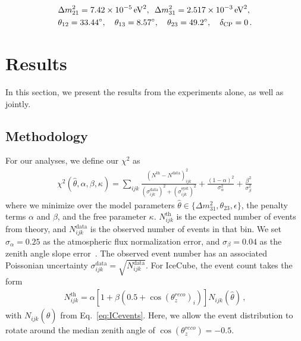 \documentclass[draft=True]{revtex4-2}
\newcommand{\zreco}{\ensuremath{\cos{(\theta_z^{reco})}}}
\newcommand{\dm}{\Delta m^2_{31}}
\begin{document}
\begin{align}\label{eq:PINGUparams}
    &\Delta m^2_{21} =  \SI{7.42e-5}{\electronvolt^2},\hspace{0.5em} \dm =  \SI{2.517e-3}{\electronvolt^2}, \nonumber \\
    &\theta_{12} = \SI{33.44}{\degree},\hspace{1em} \theta_{13} = \SI{8.57}{\degree},\hspace{1em} \theta_{23} = \SI{49.2}{\degree}, \hspace{1em} \delta_\text{CP} = 0\,.
\end{align}


\section{Results}
In this section, we present the results from the experiments alone, as well as jointly. 
\subsection{Methodology}\label{sec:method}
For our analyses, we define our $\chi^2$ as
\begin{align} \label{eq:chisq}
    \chi^{2}(\hat{\theta},\alpha,\beta, \kappa)=\sum_{ijk} \frac{\left(N^\text{th}-N^\text{data}\right)_{ijk}^{2}}
    {\left(\sigma^\text{data}_{ijk}\right)^{2} + \left(\sigma^\text{syst}_{ijk}\right)^{2}}+ 
    \frac{(1-\alpha)^2}{\sigma_\alpha^2} + \frac{\beta^2}{\sigma_\beta^2}\,
\end{align}
where we minimize over the model parameters $\hat{\theta} \in \{\dm, \theta_{23}, \epsilon\}$, the penalty terms $\alpha$ and $\beta$, and the free parameter $\kappa$.
$N_{ijk}^\text{th}$ is the expected number of events from theory, and $N_{ijk}^\text{data}$ is the observed number of events in that bin. We set $\sigma_\alpha = 0.25$ as the atmospheric flux normalization error, and $\sigma_\beta = 0.04$ as the zenith angle slope error~\cite{hondapaper}. 
The observed event number has an associated Poissonian uncertainty $\sigma_{ijk}^\text{data} = \sqrt{N_{ijk}^\text{data}}$.
For IceCube, the event count takes the form
\begin{align}
    N^\text{th}_{ijk} = \alpha\left[1+\beta (0.5 + \zreco_i )\right] N_{ijk}(\hat{\theta})\,,
\end{align}
with $N_{ijk}(\hat{\theta})$ from Eq.~\ref{eq:ICevents}. Here, we allow the event distribution to rotate around the median zenith angle of $\zreco = -0.5$.
\end{document}
